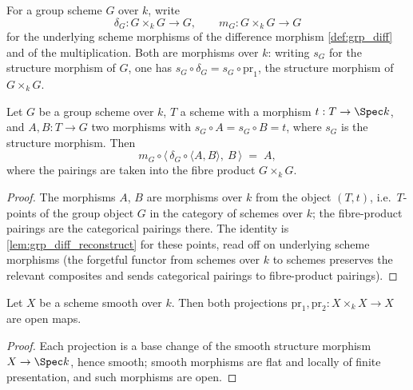 \begin{definition}
  \label{def:grp_scheme_diff}
  \leanok
  For a group scheme \(G\) over \(k\), write
  \[
    \delta_G : G \times_k G \longrightarrow G,
    \qquad
    m_G : G \times_k G \longrightarrow G
  \]
  for the underlying scheme morphisms of the difference morphism
  \ref{def:grp_diff} and of the multiplication. Both are morphisms over \(k\):
  writing \(s_G\) for the structure morphism of \(G\), one has
  \(s_G \circ \delta_G = s_G \circ \mathrm{pr}_1\), the structure morphism of
  \(G \times_k G\).
\end{definition}

\begin{lemma}
  \label{lem:grp_scheme_diff_reconstruct}
  \leanok
  Let \(G\) be a group scheme over \(k\), \(T\) a scheme with a morphism
  \(t : T \to \Spec k\), and \(A, B : T \to G\) two morphisms with
  \(s_G \circ A = s_G \circ B = t\), where \(s_G\) is the structure morphism.
  Then
  \[
    m_G \circ \bigl\langle\, \delta_G \circ \langle A, B\rangle,\ B \,\bigr\rangle
    \;=\; A ,
  \]
  where the pairings are taken into the fibre product \(G \times_k G\).
\end{lemma}
\begin{proof}
  \leanok
  The morphisms \(A\), \(B\) are morphisms over \(k\) from the object
  \((T, t)\), i.e.\ \(T\)-points of the group object \(G\) in the category of
  schemes over \(k\); the fibre-product pairings are the categorical pairings
  there. The identity is \ref{lem:grp_diff_reconstruct} for these points, read
  off on underlying scheme morphisms (the forgetful functor from schemes over
  \(k\) to schemes preserves the relevant composites and sends categorical
  pairings to fibre-product pairings).
\end{proof}

\begin{lemma}
  \label{lem:self_product_open}
  \leanok
  Let \(X\) be a scheme smooth over \(k\). Then both projections
  \(\mathrm{pr}_1, \mathrm{pr}_2 : X \times_k X \to X\) are open maps.
\end{lemma}
\begin{proof}
  \leanok
  Each projection is a base change of the smooth structure morphism
  \(X \to \Spec k\), hence smooth; smooth morphisms are flat and locally of
  finite presentation, and such morphisms are open.
\end{proof}

